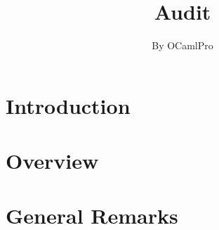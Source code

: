 \documentclass{report}
\newif\ifsolmodules
\newif\ifsolissues
\newif\ifsoldraft
\begin{document}
\title{Audit}
\author{By OCamlPro}
\maketitle
\tableofcontents
\ifsolissues
\listoffigures
\fi

\ifsoldraft
\chapter*{To edit this document}

In the report.tex file, choose:
\begin{itemize}
\item{\bf \textbackslash{}soldraftfalse} to remove draft mode (watermarks, advises)
\item{\bf \textbackslash{}solmodulestrue} to display modules by chapter instead of contracts
\item{\bf \textbackslash{}soltablestrue} to display tables for parameters and returns
\item{\bf \textbackslash{}solissuesfalse} to remove the table of issues
\end{itemize}

Issues can be entered with:
\begin{itemize}
\item{\bf \textbackslash{}issueCritical\{title\}\{text\}}
\item{\bf \textbackslash{}issueMedium\{title\}\{text\}}
\item{\bf \textbackslash{}issueLow\{title\}\{text\}}
\end{itemize}
\fi

\chapter{Introduction}
\label{chapter:introduction}


\chapter{Overview}
\label{chapter:overview}


\chapter{General Remarks}
\label{chapter:general}




\ifsolmodules

\else

\fi
\end{document}
